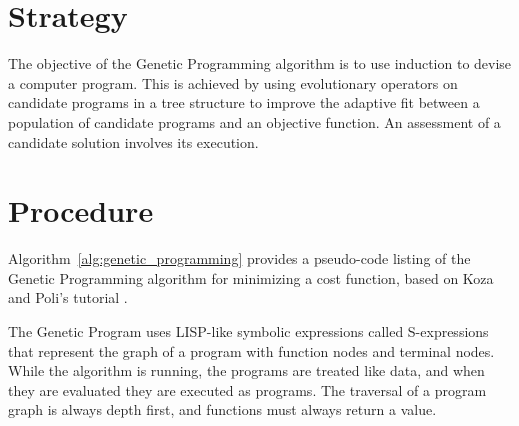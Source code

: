 \documentclass[a4paper, 11pt]{article}
\begin{document}
\section{Strategy}
\label{sec:strategy}
The objective of the Genetic Programming algorithm is to use induction to devise a computer program. 
This is achieved by using evolutionary operators on candidate programs in a tree structure to improve the adaptive fit between a population of candidate programs and an objective function. An assessment of a candidate solution involves its execution.

\section{Procedure}
\label{sec:procedure}
Algorithm~\ref{alg:genetic_programming} provides a pseudo-code listing of the Genetic Programming algorithm for minimizing a cost function, based on Koza and Poli's tutorial \cite{Koza2003a}. 

The Genetic Program uses LISP-like symbolic expressions called S-expressions that represent the graph of a program with function nodes and terminal nodes. While the algorithm is running, the programs are treated like data, and when they are evaluated they are executed as programs. The traversal of a program graph is always depth first, and functions must always return a value.
\end{document}

